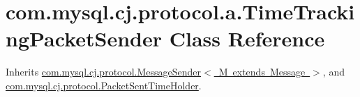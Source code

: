 \hypertarget{classcom_1_1mysql_1_1cj_1_1protocol_1_1a_1_1_time_tracking_packet_sender}{}\section{com.\+mysql.\+cj.\+protocol.\+a.\+Time\+Tracking\+Packet\+Sender Class Reference}
\label{classcom_1_1mysql_1_1cj_1_1protocol_1_1a_1_1_time_tracking_packet_sender}


Inherits \mbox{\hyperlink{interfacecom_1_1mysql_1_1cj_1_1protocol_1_1_message_sender}{com.\+mysql.\+cj.\+protocol.\+Message\+Sender$<$ M extends Message $>$}}, and \mbox{\hyperlink{interfacecom_1_1mysql_1_1cj_1_1protocol_1_1_packet_sent_time_holder}{com.\+mysql.\+cj.\+protocol.\+Packet\+Sent\+Time\+Holder}}.

